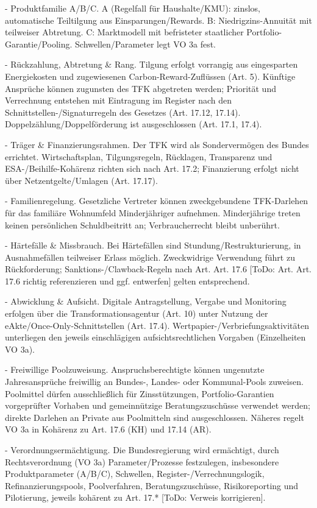 \documentclass[12pt,a4paper]{scrartcl}
\begin{document}
- Produktfamilie A/B/C. A (Regelfall für Haushalte/KMU): zinslos, automatische Teiltilgung aus Einsparungen/Rewards. B: Niedrigzins-Annuität mit teilweiser Abtretung. C: Marktmodell mit befristeter staatlicher Portfolio-Garantie/Pooling. Schwellen/Parameter legt VO 3a fest.

- Rückzahlung, Abtretung \& Rang. Tilgung erfolgt vorrangig aus eingesparten Energiekosten und zugewiesenen Carbon-Reward-Zuflüssen (Art. 5). Künftige Ansprüche können zugunsten des TFK abgetreten werden; Priorität und Verrechnung entstehen mit Eintragung im Register nach den Schnittstellen-/Signaturregeln des Gesetzes (Art. 17.12, 17.14). Doppelzählung/Doppelförderung ist ausgeschlossen (Art. 17.1, 17.4).

- Träger \& Finanzierungsrahmen. Der TFK wird als Sondervermögen des Bundes errichtet. Wirtschaftsplan, Tilgungsregeln, Rücklagen, Transparenz und ESA-/Beihilfe-Kohärenz richten sich nach Art. 17.2; Finanzierung erfolgt nicht über Netzentgelte/Umlagen (Art. 17.17).

- Familienregelung. Gesetzliche Vertreter können zweckgebundene TFK-Darlehen für das familiäre Wohnumfeld Minderjähriger aufnehmen. Minderjährige treten keinen persönlichen Schuldbeitritt an; Verbraucherrecht bleibt unberührt.

- Härtefälle \& Missbrauch. Bei Härtefällen sind Stundung/Restrukturierung, in Ausnahmefällen teilweiser Erlass möglich. Zweckwidrige Verwendung führt zu Rückforderung; Sanktions-/Clawback-Regeln nach Art. Art. 17.6 [ToDo: Art. Art. 17.6 richtig referenzieren und ggf. entwerfen] gelten entsprechend.

- Abwicklung \& Aufsicht. Digitale Antragstellung, Vergabe und Monitoring erfolgen über die Transformationsagentur (Art. 10) unter Nutzung der eAkte/Once-Only-Schnittstellen (Art. 17.4). Wertpapier-/Verbriefungsaktivitäten unterliegen den jeweils einschlägigen aufsichtsrechtlichen Vorgaben (Einzelheiten VO 3a).

- Freiwillige Poolzuweisung. Anspruchsberechtigte können ungenutzte Jahresansprüche freiwillig an Bundes-, Landes- oder Kommunal-Pools zuweisen. Poolmittel dürfen ausschließlich für Zinsstützungen, Portfolio-Garantien vorgeprüfter Vorhaben und gemeinnützige Beratungszuschüsse verwendet werden; direkte Darlehen an Private aus Poolmitteln sind ausgeschlossen. Näheres regelt VO 3a in Kohärenz zu Art. 17.6 (KH) und 17.14 (AR).

- Verordnungsermächtigung. Die Bundesregierung wird ermächtigt, durch Rechtsverordnung (VO 3a) Parameter/Prozesse festzulegen, insbesondere Produktparameter (A/B/C), Schwellen, Register-/Verrechnungslogik, Refinanzierungspools, Poolverfahren, Beratungszuschüsse, Risikoreporting und Pilotierung, jeweils kohärent zu Art. 17.* [ToDo: Verweis korrigieren].
\end{document}
